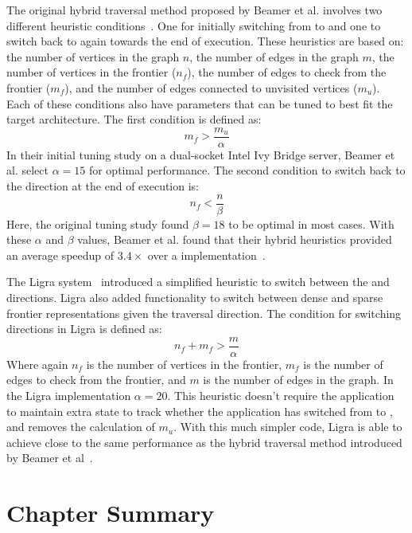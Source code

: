The original hybrid traversal method proposed by Beamer et al. involves two different heuristic conditions~\cite{beamer-bfs-direction}. 
One for initially switching from \push to \pull and one to switch back to \push again towards the end of execution. 
These heuristics are based on: the number of vertices in the graph $n$, the number of edges in the graph $m$, the number of vertices in the frontier ($n_f$), the number of edges to check from the frontier ($m_f$), and the number of edges connected to unvisited vertices ($m_u$).
Each of these conditions also have parameters that can be tuned to best fit the target architecture. 
The first condition is defined as:
\[ m_f > \frac{m_u}{\alpha}\]
In their initial tuning study on a dual-socket Intel Ivy Bridge server, Beamer et al. select $\alpha = 15$ for optimal performance.
The second condition to switch back to the \push direction at the end of execution is:
\[ n_f < \frac{n}{\beta}\]
Here, the original tuning study found $\beta = 18$ to be optimal in most cases. 
With these $\alpha$ and $\beta$ values, Beamer et al. found that their hybrid heuristics provided an average speedup of $3.4\times$ over a \push implementation~\cite{beamer2016thesis}. 

The Ligra system~\cite{shun2013ligra} introduced a simplified heuristic to switch between the \push and \pull directions. 
Ligra also added functionality to switch between dense and sparse frontier representations given the traversal direction.
The condition for switching directions in Ligra is defined as:
\[ n_f + m_f > \frac{m}{\alpha}\]
Where again $n_f$ is the number of vertices in the frontier, $m_f$ is the number of edges to check from the frontier, and $m$ is the number of edges in the graph. 
In the Ligra implementation $\alpha = 20$. 
This heuristic doesn't require the application to maintain extra state to track whether the application has switched from \push to \pull, and removes the calculation of $m_u$.
With this much simpler code, Ligra is able to achieve close to the same performance as the hybrid traversal method introduced by Beamer et al~\cite{shun2013ligra}.


\section{Chapter Summary}

